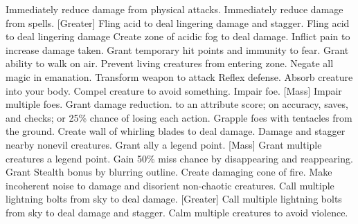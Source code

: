    {Immediately reduce damage from physical attacks.}
    {Immediately reduce damage from spells.}
[Greater]
    {Fling acid to deal lingering damage and stagger.}
    {Fling acid to deal lingering damage}
    {Create zone of acidic fog to deal damage.}
    {Inflict pain to increase damage taken.}
    {Grant temporary hit points and immunity to fear.}
    {Grant ability to walk on air.}
    {Prevent living creatures from entering zone.}
    {Negate all magic in emanation.}
    {Transform weapon to attack Reflex defense.}
    {Absorb creature into your body.}
    {Compel creature to avoid something.}
    {Impair foe.}
[Mass]
    {Impair multiple foes.}
    {Grant damage reduction.}
    { to an attribute score;  on accuracy, saves, and checks; or 25\% chance of losing each action.}
    {Grapple foes with tentacles from the ground.}
    {Create wall of whirling blades to deal damage.}
    {Damage and stagger nearby nonevil creatures.}
    {Grant ally a legend point.}
    [Mass]
    {Grant multiple creatures a legend point.}
    {Gain 50\% miss chance by disappearing and reappearing.}
    {Grant Stealth bonus by blurring outline.}
    {Create damaging cone of fire.}
    {Make incoherent noise to damage and disorient non-chaotic creatures.}
    {Call multiple lightning bolts from sky to deal damage.}
[Greater]
    {Call multiple lightning bolts from sky to deal damage and stagger.}
    {Calm multiple creatures to avoid violence.}
